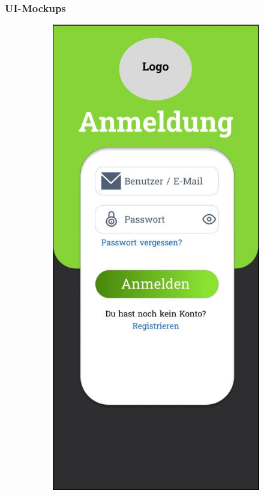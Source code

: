 \newpage
\subsubsection{UI-Mockups}

\begin{figure}[htbp]
  \centering
  \begin{subfigure}[b]{0.45\linewidth}
    \centering
    \includegraphics[width=\linewidth]{images/Mockups/Login.JPG}

\end{subfigure}
\end{figure}
